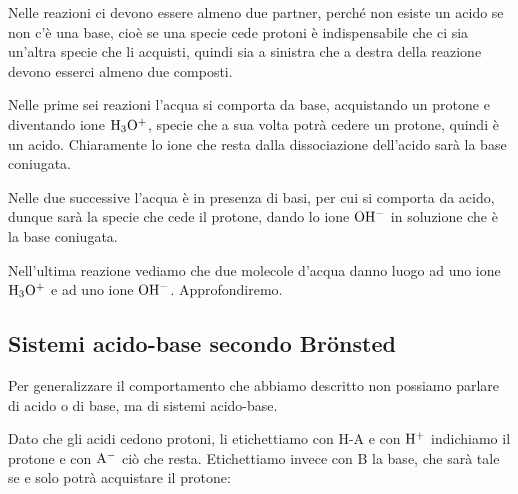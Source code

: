 Nelle reazioni ci devono essere almeno due partner, perché non esiste un acido se non c'è una base, cioè se una specie cede protoni è indispensabile che ci sia un'altra specie che li acquisti, quindi sia a sinistra che a destra della reazione devono esserci almeno due composti.

Nelle prime sei reazioni l'acqua si comporta da base, acquistando un protone e diventando ione $\rm H_3O^+$, specie che a sua volta potrà cedere un protone, quindi è un acido. Chiaramente lo ione che resta dalla dissociazione dell'acido sarà la base coniugata.

Nelle due successive l'acqua è in presenza di basi, per cui si comporta da acido, dunque sarà la specie che cede il protone, dando lo ione $\rm OH^-$ in soluzione che è la base coniugata.

Nell'ultima reazione vediamo che due molecole d'acqua danno luogo ad uno ione $\rm H_3O^+$ e ad uno ione $\rm OH^-$. Approfondiremo.
\subsection{Sistemi acido-base secondo Brönsted}
Per generalizzare il comportamento che abbiamo descritto non possiamo parlare di acido o di base, ma di sistemi acido-base.

Dato che gli acidi cedono protoni, li etichettiamo con H-A e con $\rm H^+$ indichiamo il protone e con $\rm A^-$ ciò che resta. Etichettiamo invece con B la base, che sarà tale se e solo potrà acquistare il protone:

